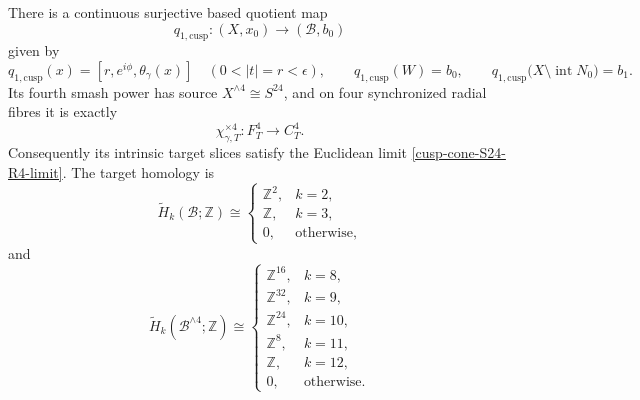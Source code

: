 \begin{proposition}
\label{cusp-cone-S24-local-route}
There is a continuous surjective based quotient map
\begin{equation}
 q_{1,\mathrm{cusp}}:(X,x_0)\longrightarrow(\mathcal B,b_0)
 \label{cusp-cone-q1-local}
\end{equation}
given by
\begin{equation}
 q_{1,\mathrm{cusp}}(x)
 =[r,e^{i\phi},\theta_\gamma(x)]
 \quad(0<|t|=r<\epsilon),\qquad
 q_{1,\mathrm{cusp}}(W)=b_0,\qquad
 q_{1,\mathrm{cusp}}
 \bigl(X\setminus\operatorname{int}N_0\bigr)=b_1.
 \label{cusp-cone-q1-local-formula}
\end{equation}
Its fourth smash power has source \(X^{\wedge4}\cong S^{24}\), and on
four synchronized radial fibres it is exactly
\begin{equation}
 \chi_{\gamma,T}^{\times4}:F_T^4\longrightarrow C_T^4.
 \label{cusp-cone-S24-local-fibre-map}
\end{equation}
Consequently its intrinsic target slices satisfy the Euclidean limit
\cref{cusp-cone-S24-R4-limit}.  The target homology is
\begin{equation}
 \widetilde H_k(\mathcal B;\mathbb Z)\cong
 \begin{cases}
  \mathbb Z^2,&k=2,\\
  \mathbb Z,&k=3,\\
  0,&\text{otherwise},
 \end{cases}
 \label{cusp-cone-B-homology}
\end{equation}
and
\begin{equation}
 \widetilde H_k(\mathcal B^{\wedge4};\mathbb Z)\cong
 \begin{cases}
  \mathbb Z^{16},&k=8,\\
  \mathbb Z^{32},&k=9,\\
  \mathbb Z^{24},&k=10,\\
  \mathbb Z^8,&k=11,\\
  \mathbb Z,&k=12,\\
  0,&\text{otherwise}.
 \end{cases}
 \label{cusp-cone-B-smash-homology}
\end{equation}
\end{proposition}

